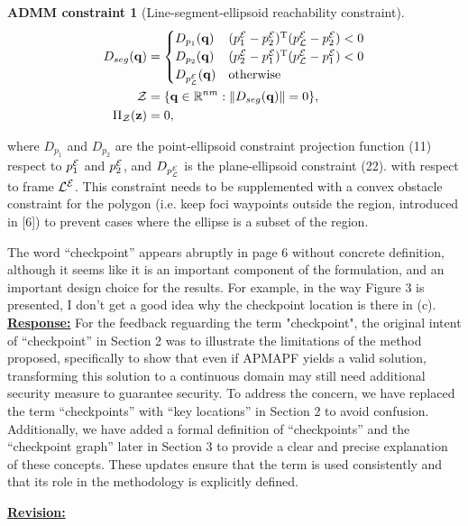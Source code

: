 \documentclass{article}
\newtheorem{constraint}{ADMM constraint}
\newcommand{\re}{\tcblower \underline{\textbf{Response:}}}
\newcommand{\rv}{{\Large{\underline{\textbf{Revision:}}}}\quad}
\begin{document}
{\begin{constraint}[Line-segment-ellipsoid reachability constraint]
\begin{align}
D_{seg}(\mathbf{q}) &=  \begin{cases}
D_{p_{1}}(\mathbf{q}) & ({p_1^{\mathcal{E}}}-{p_2^{\mathcal{E}}})^\mathrm{T} ({p_{\mathcal{L}}^{\mathcal{E}}}-{p_2^{\mathcal{E}}})<0\\
D_{p_{2}}(\mathbf{q}) & ({p_2^{\mathcal{E}}}-{p_1^{\mathcal{E}}})^\mathrm{T} ({p_{\mathcal{L}}^{\mathcal{E}}} -{p_1^{\mathcal{E}}})<0\\
D_{p_{\mathcal{L}}^{\mathcal{E}}}(\mathbf{q}) & \textrm{otherwise}
\end{cases} \label{eq:segment_ellipsoid_constraint}\\
  \mathcal{Z} &= \{\mathbf{q}\in\mathbb{R}^{nm}:\lVert D_{seg}(\mathbf{q})\rVert = 0 \},\\
   \Pi_{\mathcal{Z}}(\mathbf{z}) & = 0, 
\end{align}
\end{constraint}
where $D_{p_{1}}$ and $D_{p_{2}}$ are the point-ellipsoid constraint projection function (11) respect to ${p_{1}^{\mathcal{E}}}$ and ${p_{2}^{\mathcal{E}}}$, and $D_{p_{\mathcal{L}}^{\mathcal{E}}}$ is the plane-ellipsoid constraint (22). with respect to frame ${\mathcal{L}^{\mathcal{E}}}$.
This constraint needs to be supplemented with a convex obstacle constraint for the polygon (i.e. keep foci waypoints outside the region, introduced in [6]) to prevent cases where the ellipse is a subset of the region.
}

\vspace{0.2cm}
\begin{cmt}{}{}
	The word “checkpoint” appears abruptly in page 6 without concrete
	definition, although it seems like it is an important component of the
	formulation, and an important design choice for the results. For
	example, in the way Figure 3 is presented, I don't get a good idea why
	the checkpoint location is there in (c). 
	\re 
	\noindent
 For the feedback reguarding the term "checkpoint", the original intent of “checkpoint” in Section 2 was to illustrate the limitations of the method proposed, specifically to show that even if APMAPF yields a valid solution, transforming this solution to a continuous domain may still need additional security measure to guarantee security. To address the concern, we have replaced the term “checkpoints” with “key locations” in Section 2 to avoid confusion. Additionally, we have added a formal definition of “checkpoints” and the “checkpoint graph” later in Section 3 to provide a clear and precise explanation of these concepts. These updates ensure that the term is used consistently and that its role in the methodology is explicitly defined. 
\end{cmt}
\rv
\renewcommand\thesubsection{H}
\end{document}
